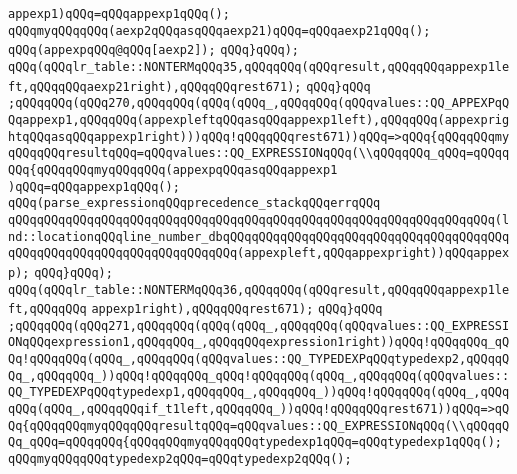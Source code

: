 \verb|appexp1)qQQq=qQQqappexp1qQQq();|\newline
\verb|qQQqmyqQQqqQQq(aexp2qQQqasqQQqaexp21)qQQq=qQQqaexp21qQQq();|\newline
\verb|qQQq(appexpqQQq@qQQq[aexp2]);|\newline
\verb|qQQq}qQQq);|\newline
\verb|qQQq(qQQqlr_table::NONTERMqQQq35,qQQqqQQq(qQQqresult,qQQqqQQqappexp1left,qQQqqQQqaexp21right),qQQqqQQqrest671);|\newline
\verb|qQQq}qQQq|\newline
\verb|;qQQqqQQq(qQQq270,qQQqqQQq(qQQq(qQQq_,qQQqqQQq(qQQqvalues::QQ_APPEXPqQQqappexp1,qQQqqQQq(appexpleftqQQqasqQQqappexp1left),qQQqqQQq(appexprightqQQqasqQQqappexp1right)))qQQq!qQQqqQQqrest671))qQQq=>qQQq{qQQqqQQqmyqQQqqQQqresultqQQq=qQQqvalues::QQ_EXPRESSIONqQQq(\\qQQqqQQq_qQQq=qQQqqQQq{qQQqqQQqmyqQQqqQQq(appexpqQQqasqQQqappexp1|\newline
\verb|)qQQq=qQQqappexp1qQQq();|\newline
\verb|qQQq(parse_expressionqQQqprecedence_stackqQQqerrqQQq|\newline
\verb|qQQqqQQqqQQqqQQqqQQqqQQqqQQqqQQqqQQqqQQqqQQqqQQqqQQqqQQqqQQqqQQqqQQq(lnd::locationqQQqline_number_dbqQQqqQQqqQQqqQQqqQQqqQQqqQQqqQQqqQQqqQQqqQQqqQQqqQQqqQQqqQQqqQQqqQQqqQQq(appexpleft,qQQqappexpright))qQQqappexp);|\newline
\verb|qQQq}qQQq);|\newline
\verb|qQQq(qQQqlr_table::NONTERMqQQq36,qQQqqQQq(qQQqresult,qQQqqQQqappexp1left,qQQqqQQq|\newline
\verb|appexp1right),qQQqqQQqrest671);|\newline
\verb|qQQq}qQQq|\newline
\verb|;qQQqqQQq(qQQq271,qQQqqQQq(qQQq(qQQq_,qQQqqQQq(qQQqvalues::QQ_EXPRESSIONqQQqexpression1,qQQqqQQq_,qQQqqQQqexpression1right))qQQq!qQQqqQQq_qQQq!qQQqqQQq(qQQq_,qQQqqQQq(qQQqvalues::QQ_TYPEDEXPqQQqtypedexp2,qQQqqQQq_,qQQqqQQq_))qQQq!qQQqqQQq_qQQq!qQQqqQQq(qQQq_,qQQqqQQq(qQQqvalues::QQ_TYPEDEXPqQQqtypedexp1,qQQqqQQq_,qQQqqQQq_))qQQq!qQQqqQQq(qQQq_,qQQq|\newline
\verb|qQQq(qQQq_,qQQqqQQqif_t1left,qQQqqQQq_))qQQq!qQQqqQQqrest671))qQQq=>qQQq{qQQqqQQqmyqQQqqQQqresultqQQq=qQQqvalues::QQ_EXPRESSIONqQQq(\\qQQqqQQq_qQQq=qQQqqQQq{qQQqqQQqmyqQQqqQQqtypedexp1qQQq=qQQqtypedexp1qQQq();|\newline
\verb|qQQqmyqQQqqQQqtypedexp2qQQq=qQQqtypedexp2qQQq();|\newline
